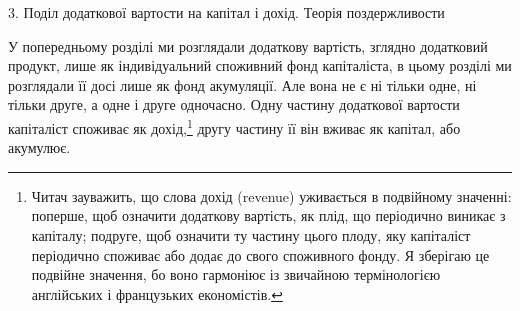 3. Поділ додаткової вартости на капітал і дохід.
Теорія поздержливости

У попередньому розділі ми розглядали додаткову вартість,
зглядно додатковий продукт, лише як індивідуальний споживний
фонд капіталіста, в цьому розділі ми розглядали її досі лише як
фонд акумуляції. Але вона не є ні тільки одне, ні тільки друге,
а одне і друге одночасно. Одну частину додаткової вартости капіталіст
споживає як дохід,\footnote{
Читач зауважить, що слова дохід (revenue) уживається в подвійному
значенні: поперше, щоб означити додаткову вартість, як плід, що
періодично виникає з капіталу; подруге, щоб означити ту частину цього
плоду, яку капіталіст періодично споживає або додає до свого споживного
фонду. Я зберігаю це подвійне значення, бо воно гармоніює із звичайною
термінологією англійських і французьких економістів.
} другу частину її він вживає як капітал,
або акумулює.

